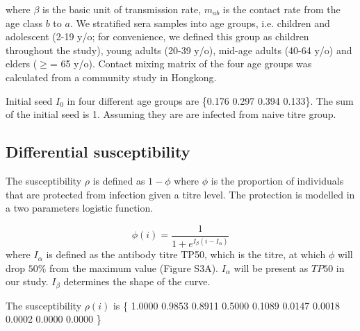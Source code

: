 \documentclass{article}
\begin{document}
where $\beta$ is the basic unit of transmission rate, $m_{ab}$ is the contact rate from the age class $b$ to $a$. We stratified sera samples into age groups, i.e. children and adolescent (2-19 y/o; for convenience, we defined this group as children throughout the study), young adults (20-39 y/o), mid-age adults (40-64 y/o) and elders ($\geq$= 65 y/o). Contact mixing matrix of the four age groups was calculated from a community study in Hongkong.

Initial seed $I_{0}$ in four different age groups are \{0.176 0.297 0.394 0.133\}. The sum of the initial seed is 1. Assuming they are are infected from naive titre group.

\subsection{Differential susceptibility}
The susceptibility $\rho$ is defined as $1-\phi$ where $\phi$ is the proportion of individuals that are protected from infection given a titre level. The protection is modelled in a two parameters logistic function.

\begin{equation}
 \phi(i) = \frac{1}{1+e^{I_{\beta}({i}-I_{\alpha})}}
\end{equation}
where $I_{\alpha}$ is defined as the antibody titre TP50, which is the titre, at which $\phi$ will drop $50\%$ from the maximum value (Figure S3A). $I_{\alpha}$ will be present as $\mathit{TP50}$ in our study. $I_{\beta}$ determines the shape of the curve.

The susceptibility $\rho(i)$ is \{
    1.0000
    0.9853
    0.8911
    0.5000
    0.1089
    0.0147
    0.0018
    0.0002
    0.0000
    0.0000  \}
\end{document}

